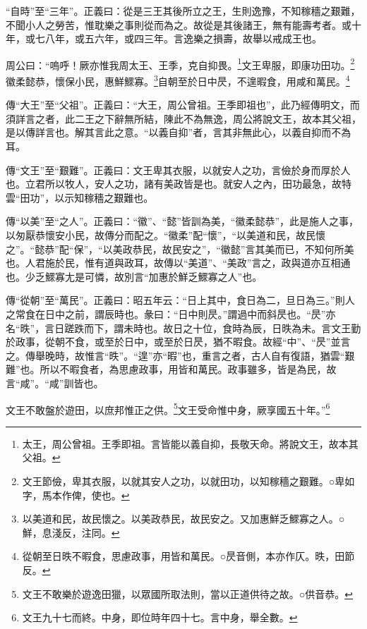 {\noindent\shu{}\fzkt “自時”至“三年”。正義曰：從是三王其後所立之王，生則逸豫，不知稼穡之艱難，不聞小人之勞苦，惟耽樂之事則從而為之。故從是其後諸王，無有能壽考者。或十年，或七八年，或五六年，或四三年。言逸樂之損壽，故舉以戒成王也。 \par}

周公曰：“嗚呼！厥亦惟我周太王、王季，克自抑畏。\footnote{太王，周公曾祖。王季即祖。言皆能以義自抑，長敬天命。將說文王，故本其父祖。}文王卑服，即康功田功。\footnote{文王節儉，卑其衣服，以就其安人之功，以就田功，以知稼穡之艱難。○卑如字，馬本作俾，使也。}徽柔懿恭，懷保小民，惠鮮鰥寡。\footnote{以美道和民，故民懷之。以美政恭民，故民安之。又加惠鮮乏鰥寡之人。○鮮，息淺反，注同。}自朝至於日中昃，不遑暇食，用咸和萬民。\footnote{從朝至日昳不暇食，思慮政事，用皆和萬民。○昃音側，本亦作仄。昳，田節反。}


{\noindent\zhuan{}\fzbyks 傳“大王”至“父祖”。正義曰：“大王，周公曾祖。王季即祖也”，此乃經傳明文，而須詳言之者，此二王之下辭無所結，陳此不為無逸，周公將說文王，故本其父祖，是以傳詳言也。解其言此之意。“以義自抑”者，言其非無此心，以義自抑而不為耳。 \par}

{\noindent\zhuan{}\fzbyks 傳“文王”至“艱難”。正義曰：文王卑其衣服，以就安人之功，言儉於身而厚於人也。立君所以牧人，安人之功，諸有美政皆是也。就安人之內，田功最急，故特雲“田功”，以示知稼穡之艱難也。 \par}

{\noindent\zhuan{}\fzbyks 傳“以美”至“之人”。正義曰：“徽”、“懿”皆訓為美，“徽柔懿恭”，此是施人之事，以匆厭恭懷安小民，故傳分而配之。“徽柔”配“懷”，“以美道和民，故民懷之”。“懿恭”配“保”，“以美政恭民，故民安之”，“徽懿”言其美而已，不知何所美也。人君施於民，惟有道與政耳，故傳以“美道”、“美政”言之，政與道亦互相通也。少乏鰥寡尢是可憐，故別言“加惠於鮮乏鰥寡之人”也。 \par}

{\noindent\zhuan{}\fzbyks 傳“從朝”至“萬民”。正義曰：昭五年云：“日上其中，食日為二，旦日為三。”則人之常食在日中之前，謂辰時也。彖曰：“日中則昃。”謂過中而斜昃也。“昃”亦名“昳”，言日蹉跌而下，謂未時也。故日之十位，食時為辰，日昳為未。言文王勤於政事，從朝不食，或至於日中，或至於日昃，猶不暇食。故經“中”、“昃”並言之。傳舉晚時，故惟言“昳”。“遑”亦“暇”也，重言之者，古人自有復語，猶雲“艱難”也。所以不暇食者，為思慮政事，用皆和萬民。政事雖多，皆是為民，故言“咸”。“咸”訓皆也。 \par}

文王不敢盤於遊田，以庶邦惟正之供。\footnote{文王不敢樂於遊逸田獵，以眾國所取法則，當以正道供待之故。○供音恭。}文王受命惟中身，厥享國五十年。”\footnote{文王九十七而終。中身，即位時年四十七。言中身，舉全數。}

